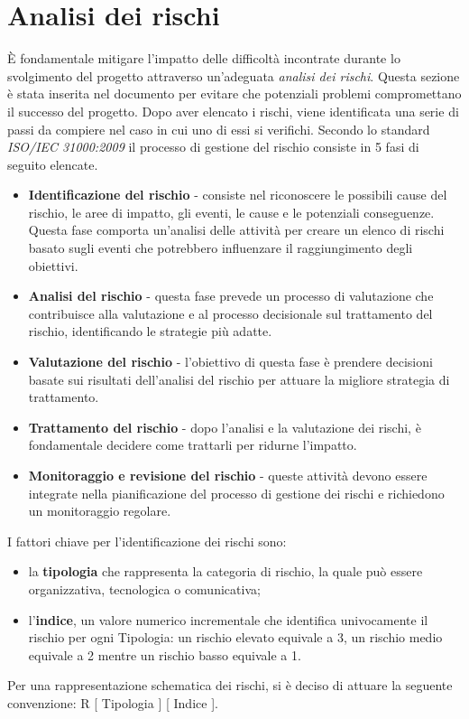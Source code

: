 \section{Analisi dei rischi} %
È fondamentale mitigare l'impatto delle difficoltà incontrate durante lo svolgimento del progetto attraverso un'adeguata \textit{analisi dei rischi}. Questa sezione è stata inserita nel documento per evitare che potenziali problemi compromettano il successo del progetto.
Dopo aver elencato i rischi, viene identificata una serie di passi da compiere nel caso in cui uno di essi si verifichi. Secondo lo standard \textit{ISO/IEC 31000:2009} il processo di gestione del rischio consiste in 5 fasi di seguito elencate.
\begin{itemize}
    \item \textbf{Identificazione del rischio} - consiste nel riconoscere le possibili cause del rischio, le aree di impatto, gli eventi, le cause e le potenziali conseguenze. Questa fase comporta un'analisi delle attività per creare un elenco di rischi basato sugli eventi che potrebbero influenzare il raggiungimento degli obiettivi.
    \item \textbf{Analisi del rischio} - questa fase prevede un processo di valutazione che contribuisce alla valutazione e al processo decisionale sul trattamento del rischio, identificando le strategie più adatte.
    \item \textbf{Valutazione del rischio} - l'obiettivo di questa fase è prendere decisioni basate sui risultati dell'analisi del rischio per attuare la migliore strategia di trattamento.
    \item \textbf{Trattamento del rischio} - dopo l'analisi e la valutazione dei rischi, è fondamentale decidere come trattarli per ridurne l'impatto.
    \item \textbf{Monitoraggio e revisione del rischio} - queste attività devono essere integrate nella pianificazione del processo di gestione dei rischi e richiedono un monitoraggio regolare.
\end{itemize}
I fattori chiave per l'identificazione dei rischi sono:
\begin{itemize}
    \item la \textbf{tipologia} che rappresenta la categoria di rischio, la quale può essere organizzativa, tecnologica o comunicativa;
    \item l'\textbf{indice}, un valore numerico incrementale che identifica univocamente il rischio per ogni Tipologia: un rischio elevato equivale a 3, un rischio medio equivale a 2 mentre un rischio basso equivale a 1.
\end{itemize}
Per una rappresentazione schematica dei rischi, si è deciso di attuare la seguente convenzione: R [ Tipologia ] [ Indice ].

